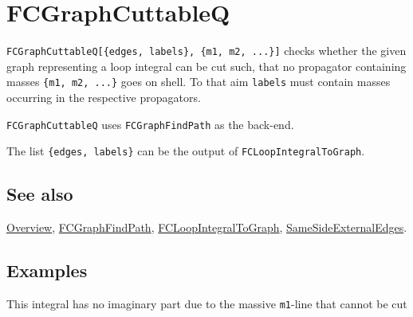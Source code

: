 \documentclass[../FeynCalcManual.tex]{subfiles}
\begin{document}
\hypertarget{fcgraphcuttableq}{
\section{FCGraphCuttableQ}\label{fcgraphcuttableq}}

\texttt{FCGraphCuttableQ[\allowbreak{}\{\allowbreak{}edges,\ \allowbreak{}labels\},\ \allowbreak{}\{\allowbreak{}m1,\ \allowbreak{}m2,\ \allowbreak{}...\}]}
checks whether the given graph representing a loop integral can be cut
such, that no propagator containing masses
\texttt{\{\allowbreak{}m1,\ \allowbreak{}m2,\ \allowbreak{}...\}} goes
on shell. To that aim \texttt{labels} must contain masses occurring in
the respective propagators.

\texttt{FCGraphCuttableQ} uses \texttt{FCGraphFindPath} as the back-end.

The list \texttt{\{\allowbreak{}edges,\ \allowbreak{}labels\}} can be
the output of \texttt{FCLoopIntegralToGraph}.

\subsection{See also}

\hyperlink{toc}{Overview}, \hyperlink{fcgraphfindpath}{FCGraphFindPath},
\hyperlink{fcloopintegraltograph}{FCLoopIntegralToGraph},
\hyperlink{samesideexternaledges}{SameSideExternalEdges}.

\subsection{Examples}

This integral has no imaginary part due to the massive \texttt{m1}-line
that cannot be cut
\end{document}
